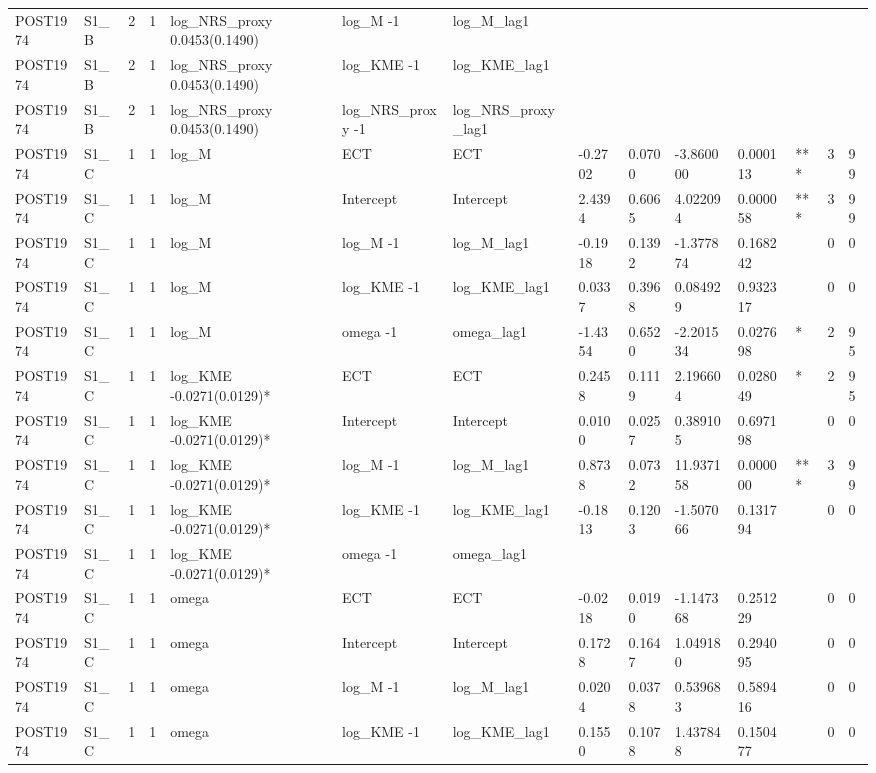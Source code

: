 \begin{tabular}{llllllllllllll}
POST1974 & S1\_B & 2 & 1 & log\_NRS\_proxy 0.0453(0.1490) & log\_M -1 & log\_M\_lag1 &  &  &  &  &  &  &  \\
POST1974 & S1\_B & 2 & 1 & log\_NRS\_proxy 0.0453(0.1490) & log\_KME -1 & log\_KME\_lag1 &  &  &  &  &  &  &  \\
POST1974 & S1\_B & 2 & 1 & log\_NRS\_proxy 0.0453(0.1490) & log\_NRS\_proxy -1 & log\_NRS\_proxy\_lag1 &  &  &  &  &  &  &  \\
POST1974 & S1\_C & 1 & 1 & log\_M & ECT & ECT & -0.2702 & 0.0700 & -3.860000 & 0.000113 & *** & 3 & 99 \\
POST1974 & S1\_C & 1 & 1 & log\_M & Intercept & Intercept & 2.4394 & 0.6065 & 4.022094 & 0.000058 & *** & 3 & 99 \\
POST1974 & S1\_C & 1 & 1 & log\_M & log\_M -1 & log\_M\_lag1 & -0.1918 & 0.1392 & -1.377874 & 0.168242 &  & 0 & 0 \\
POST1974 & S1\_C & 1 & 1 & log\_M & log\_KME -1 & log\_KME\_lag1 & 0.0337 & 0.3968 & 0.084929 & 0.932317 &  & 0 & 0 \\
POST1974 & S1\_C & 1 & 1 & log\_M & omega -1 & omega\_lag1 & -1.4354 & 0.6520 & -2.201534 & 0.027698 & * & 2 & 95 \\
POST1974 & S1\_C & 1 & 1 & log\_KME -0.0271(0.0129)* & ECT & ECT & 0.2458 & 0.1119 & 2.196604 & 0.028049 & * & 2 & 95 \\
POST1974 & S1\_C & 1 & 1 & log\_KME -0.0271(0.0129)* & Intercept & Intercept & 0.0100 & 0.0257 & 0.389105 & 0.697198 &  & 0 & 0 \\
POST1974 & S1\_C & 1 & 1 & log\_KME -0.0271(0.0129)* & log\_M -1 & log\_M\_lag1 & 0.8738 & 0.0732 & 11.937158 & 0.000000 & *** & 3 & 99 \\
POST1974 & S1\_C & 1 & 1 & log\_KME -0.0271(0.0129)* & log\_KME -1 & log\_KME\_lag1 & -0.1813 & 0.1203 & -1.507066 & 0.131794 &  & 0 & 0 \\
POST1974 & S1\_C & 1 & 1 & log\_KME -0.0271(0.0129)* & omega -1 & omega\_lag1 &  &  &  &  &  &  &  \\
POST1974 & S1\_C & 1 & 1 & omega & ECT & ECT & -0.0218 & 0.0190 & -1.147368 & 0.251229 &  & 0 & 0 \\
POST1974 & S1\_C & 1 & 1 & omega & Intercept & Intercept & 0.1728 & 0.1647 & 1.049180 & 0.294095 &  & 0 & 0 \\
POST1974 & S1\_C & 1 & 1 & omega & log\_M -1 & log\_M\_lag1 & 0.0204 & 0.0378 & 0.539683 & 0.589416 &  & 0 & 0 \\
POST1974 & S1\_C & 1 & 1 & omega & log\_KME -1 & log\_KME\_lag1 & 0.1550 & 0.1078 & 1.437848 & 0.150477 &  & 0 & 0 \\

\end{tabular}

